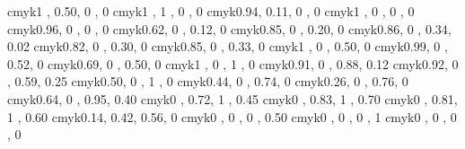\definecolor{col:royalblue}     {cmyk}{1   , 0.50, 0   , 0   }
\definecolor{col:blue}          {cmyk}{1   , 1   , 0   , 0   }
\definecolor{col:cerulean}      {cmyk}{0.94, 0.11, 0   , 0   }
\definecolor{col:cyan}          {cmyk}{1   , 0   , 0   , 0   }
\definecolor{col:processblue}   {cmyk}{0.96, 0   , 0   , 0   }
\definecolor{col:skyblue}       {cmyk}{0.62, 0   , 0.12, 0   }
\definecolor{col:turquoise}     {cmyk}{0.85, 0   , 0.20, 0   }
\definecolor{col:tealblue}      {cmyk}{0.86, 0   , 0.34, 0.02}
\definecolor{col:aquamarine}    {cmyk}{0.82, 0   , 0.30, 0   }
\definecolor{col:bluegreen}     {cmyk}{0.85, 0   , 0.33, 0   }
\definecolor{col:emerald}       {cmyk}{1   , 0   , 0.50, 0   }
\definecolor{col:junglegreen}   {cmyk}{0.99, 0   , 0.52, 0   }
\definecolor{col:seagreen}      {cmyk}{0.69, 0   , 0.50, 0   }
\definecolor{col:green}         {cmyk}{1   , 0   , 1   , 0   }
\definecolor{col:forestgreen}   {cmyk}{0.91, 0   , 0.88, 0.12}
\definecolor{col:pinegreen}     {cmyk}{0.92, 0   , 0.59, 0.25}
\definecolor{col:limegreen}     {cmyk}{0.50, 0   , 1   , 0   }
\definecolor{col:yellowgreen}   {cmyk}{0.44, 0   , 0.74, 0   }
\definecolor{col:springgreen}   {cmyk}{0.26, 0   , 0.76, 0   }
\definecolor{col:olivegreen}    {cmyk}{0.64, 0   , 0.95, 0.40}
\definecolor{col:rawsienna}     {cmyk}{0   , 0.72, 1   , 0.45}
\definecolor{col:sepia}         {cmyk}{0   , 0.83, 1   , 0.70}
\definecolor{col:brown}         {cmyk}{0   , 0.81, 1   , 0.60}
\definecolor{col:tan}           {cmyk}{0.14, 0.42, 0.56, 0   }
\definecolor{col:gray}          {cmyk}{0   , 0   , 0   , 0.50}
\definecolor{col:black}         {cmyk}{0   , 0   , 0   , 1   }
\definecolor{col:white}         {cmyk}{0   , 0   , 0   , 0   } 

\ifpdf
   \usepackage[plainpages=false,pdfpagelabels,bookmarksnumbered,hidelinks,%
   linkcolor=col:red,%
   citecolor=col:green,%
   urlcolor=col:royalblue,%
   pdftex,%
   unicode,%
   breaklinks=true,%
   ]{hyperref} 
\else
    \usepackage{hyperref}
\fi

